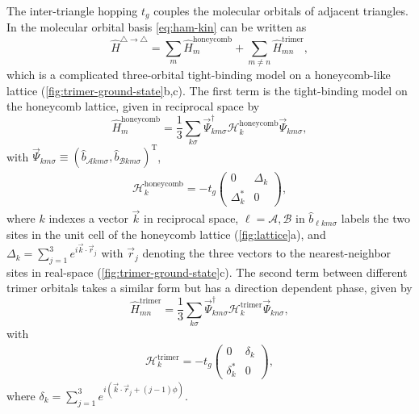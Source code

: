 \documentclass[reprint,aps,prb,amsmath,amssymb]{revtex4-2}
\begin{document}
The inter-triangle hopping $t_g$ couples the molecular orbitals of adjacent triangles. In the molecular orbital basis \cref{eq:ham-kin} can be written as
%
\begin{equation}
\hat{H}^{\triangle \rightarrow \triangle} = \sum_m \hat{H}_m^{\mathrm{honeycomb}} + \sum_{m\neq n} \hat{H}_{mn}^{\mathrm{trimer}},
\end{equation}
%
which is a complicated three-orbital tight-binding model on a honeycomb-like lattice (\cref{fig:trimer-ground-state}b,c). The first term is the tight-binding model on the honeycomb lattice, given in reciprocal space by 
%
\begin{equation}
	\hat{H}_m^{\mathrm{honeycomb}} = \frac{1}{3} \sum_{k\sigma} \vec{\Psi}_{km\sigma}^{\dagger} \bm{\mathcal{H}}_{k}^{\mathrm{honeycomb}} \vec{\Psi}_{km\sigma}^{},
\end{equation}
%
with $\vec{\Psi}_{km\sigma} \equiv (\hat{b}_{\mathcal{A}km\sigma}, \hat{b}_{\mathcal{B}km\sigma})^{\mathrm{T}}$,
%
\begin{align}
	\bm{\mathcal{H}}_k^{\mathrm{honeycomb}} = - t_g \begin{pmatrix}
		0 & \Delta_k \\
		\Delta_k^* & 0
	\end{pmatrix},
\end{align}
%
where $k$ indexes a vector $\vec{k}$ in reciprocal space, $\ell = \mathcal{A}, \mathcal{B}$ in $\hat{b}_{\ell km\sigma}$ labels the two sites in the unit cell of the honeycomb lattice (\cref{fig:lattice}a), and $\Delta_k = \sum_{j=1}^{3} e^{i \vec{k} \cdot \vec{r}_j}$ with $\vec{r}_j$ denoting the three vectors to the nearest-neighbor sites in real-space (\cref{fig:trimer-ground-state}c).
%
The second term between different trimer orbitals takes a similar form but has a direction dependent phase, given by
%
\begin{equation}
	\hat{H}_{mn}^{\mathrm{trimer}} = \frac{1}{3} \sum_{k\sigma} \vec{\Psi}_{km\sigma}^{\dagger} \bm{\mathcal{H}}_{k}^{\mathrm{trimer}} \vec{\Psi}_{kn\sigma}^{},
\end{equation}
%
with
%
\begin{align}
	\bm{\mathcal{H}}_k^{\mathrm{trimer}} = - t_g \begin{pmatrix}
		0 & \delta_k \\
		\delta_k^* & 0
	\end{pmatrix},
\end{align}
%
where $\delta_k = \sum_{j=1}^{3} e^{i (\vec{k} \cdot \vec{r}_j + (j-1) \phi)}$.
\end{document}
